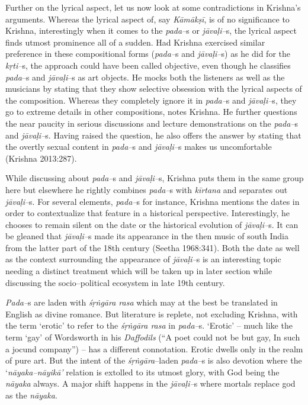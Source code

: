 Further on the lyrical aspect, let us now look at some contradictions in Krishna’s arguments. Whereas the lyrical aspect of, say \textit{Kāmākṣī}, is of no significance to Krishna, interestingly when it comes to the \textit{pada–}s or \textit{jāvaḷi–}s, the lyrical aspect finds utmost prominence all of a sudden. Had Krishna exercised similar preference in these compositional forms (\textit{pada–}s and \textit{jāvaḷi–}s) as he did for the \textit{kṛti–}s, the approach could have been called objective, even though he classifies \textit{pada}–s and \textit{jāvaḷi}–s as art objects. He mocks both the listeners as well as the musicians by stating that they show selective obsession with the lyrical aspects of the composition. Whereas they completely ignore it in \textit{pada–}s and \textit{jāvaḷi–}s, they go to extreme details in other compositions, notes Krishna. He further questions the near paucity in serious discussions and lecture demonstrations on the \textit{pada–}s and \textit{jāvaḷi–}s. Having raised the question, he also offers the answer by stating that the overtly sexual content in \textit{pada–}s and \textit{jāvaḷi–}s makes us uncomfortable (Krishna 2013:287).

While discussing about \textit{pada–}s and \textit{jāvaḷi–}s, Krishna puts them in the same group here but elsewhere he rightly combines \textit{pada–}s with \textit{kīrtana} and separates out \textit{jāvaḷi–}s. For several elements, \textit{pada–}s for instance, Krishna mentions the dates in order to contextualize that feature in a historical perspective. Interestingly, he chooses to remain silent on the date or the historical evolution of \textit{jāvaḷi–}s. It can be gleaned that \textit{jāvaḷi–}s made its appearance in the then music of south India from the latter part of the 18th century (Seetha 1968:341). Both the date as well as the context surrounding the appearance of \textit{jāvaḷi–}s is an interesting topic needing a distinct treatment which will be taken up in later section while discussing the socio–political ecosystem in late 19th century.

\textit{Pada–}s are laden with \textit{śṛṅgāra rasa} which may at the best be translated in English as divine romance. But literature is replete, not excluding Krishna, with the term ‘erotic’ to refer to the \textit{śṛṅgāra rasa} in \textit{pada–}s. ‘Erotic’ – much like the term ‘gay’ of Wordsworth in his \textit{Daffodils} (“A poet could not be but gay, In such a jocund company”) – has a different connotation. Erotic dwells only in the realm of pure art. But the intent of the \textit{śṛṅgāra}–laden \textit{pada–}s is also devotion where the ‘\textit{nāyaka–nāyikā’} relation is extolled to its utmost glory, with God being the \textit{nāyaka} always. A major shift happens in the \textit{jāvaḷi–}s where mortals replace god as the \textit{nāyaka}.

